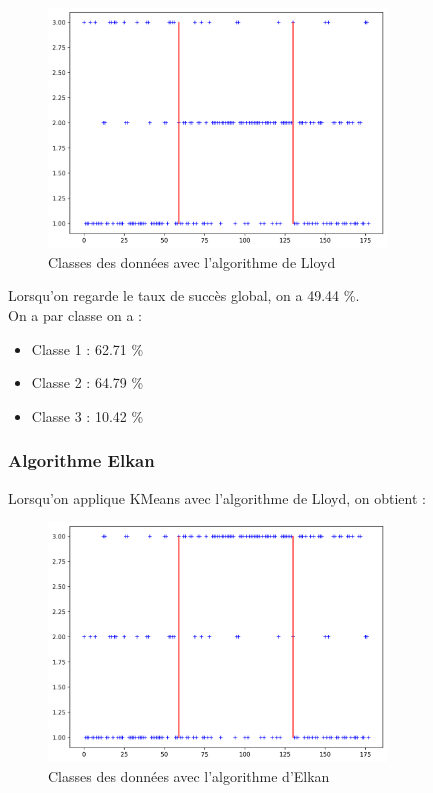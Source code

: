 \documentclass[a4paper,12pt]{article}
\begin{document}
\begin{figure}[h!] %
   \centering
   \includegraphics[width=0.8\textwidth]{lloyd.png} %
   \caption{Classes des données avec l'algorithme de Lloyd}
   \label{fig:lloyd} %
\end{figure}

Lorsqu'on regarde le taux de succès global, on a 49.44 \%.\\

On a par classe on a :
\begin{itemize}
\item Classe 1 : 62.71 \%
\item Classe 2 : 64.79 \%
\item Classe 3 : 10.42 \%
\end{itemize}


\subsubsection{Algorithme Elkan}
Lorsqu'on applique KMeans avec l'algorithme de Lloyd, on obtient :

\begin{figure}[h!] %
   \centering
   \includegraphics[width=0.8\textwidth]{elkan.png} %
   \caption{Classes des données avec l'algorithme d'Elkan}
   \label{fig:elkan} %
\end{figure}
\end{document}
